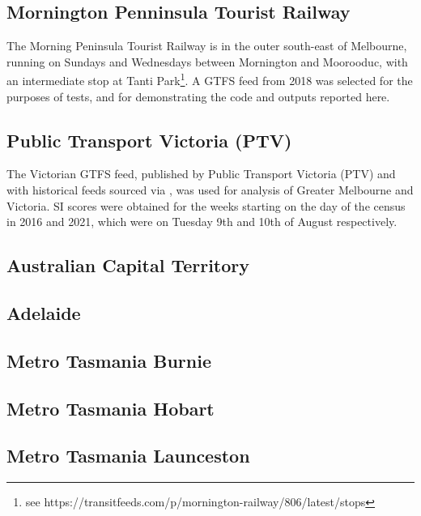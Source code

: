 \documentclass[preprint, 3p,
authoryear]{elsarticle} %
\begin{document}
\subsection{Mornington Penninsula Tourist
Railway}\label{mornington-penninsula-tourist-railway}

The Morning Peninsula Tourist Railway is in the outer south-east of
Melbourne, running on Sundays and Wednesdays between Mornington and
Moorooduc, with an intermediate stop at Tanti Park\footnote{see
  https://transitfeeds.com/p/mornington-railway/806/latest/stops}. A
GTFS feed from 2018 was selected for the purposes of tests, and for
demonstrating the code and outputs reported here.

\subsection{Public Transport Victoria
(PTV)}\label{public-transport-victoria-ptv}

The Victorian GTFS feed, published by Public Transport Victoria (PTV)
and with historical feeds sourced via
\citet{transitfeeds_victoria:2023aa}, was used for analysis of Greater
Melbourne and Victoria. SI scores were obtained for the weeks starting
on the day of the census in 2016 and 2021, which were on Tuesday 9th and
10th of August respectively.

\subsection{Australian Capital
Territory}\label{australian-capital-territory}

\subsection{Adelaide}\label{adelaide}

\subsection{Metro Tasmania Burnie}\label{metro-tasmania-burnie}

\subsection{Metro Tasmania Hobart}\label{metro-tasmania-hobart}

\subsection{Metro Tasmania Launceston}\label{metro-tasmania-launceston}
\end{document}
